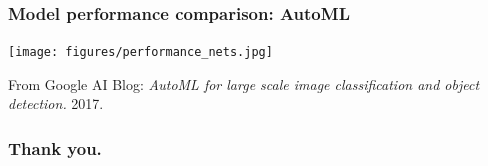 \documentclass[10pt,hyperref={pdfpagelabels=false}]{beamer}
\begin{document}
\begin{frame}
    \frametitle{Model performance comparison: AutoML}
    \centering\texttt{[image: figures/performance\_nets.jpg]}

    {\small From Google AI Blog: \emph{AutoML for large scale image classification and object detection.} 2017.}
\end{frame}
\begin{frame}
    \frametitle{Thank you.}
\end{frame}
\end{document}
